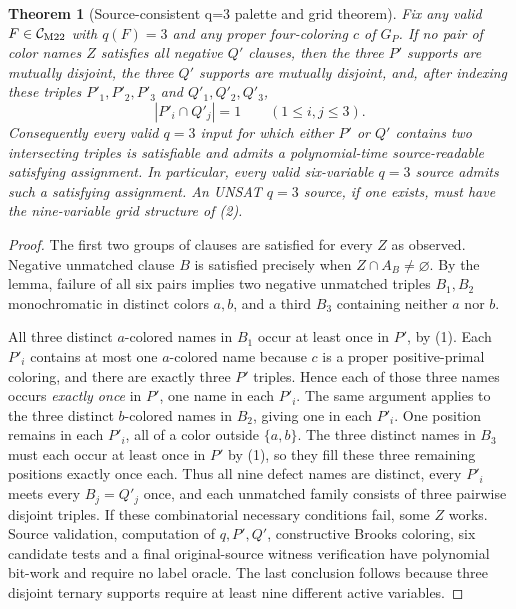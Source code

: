 \documentclass[11pt]{article}
\newtheorem{theorem}{Theorem}
\newcommand{\CM}{\mathcal C_{\rm M22}}
\begin{document}
\begin{theorem}[Source-consistent q=3 palette and grid theorem]
Fix \emph{any} valid $F\in\CM$ with $q(F)=3$ and any proper
four-coloring $c$ of $G_P$.
If no pair of color names $Z$ satisfies all negative $Q'$ clauses,
then the three $P'$ supports are mutually disjoint, the three $Q'$
supports are mutually disjoint, and, after indexing these triples
$P'_1,P'_2,P'_3$ and $Q'_1,Q'_2,Q'_3$,
\[
     |P'_i\cap Q'_j|=1\qquad(1\le i,j\le3).       \tag{2}
\]
Consequently every valid $q=3$ input for which either $P'$ or
$Q'$ contains two intersecting triples is satisfiable and admits
a polynomial-time source-readable satisfying assignment.
In particular, every valid six-variable $q=3$ source admits
such a satisfying assignment. An UNSAT $q=3$ source, if one exists,
must have the nine-variable grid structure of (2).
\end{theorem}
\begin{proof}
The first two groups of clauses are satisfied for every $Z$ as
observed. Negative unmatched clause $B$ is satisfied precisely
when $Z\cap A_B\ne\varnothing$. By the lemma, failure of all six
pairs implies two negative unmatched triples $B_1,B_2$ monochromatic
in distinct colors $a,b$, and a third $B_3$ containing neither
$a$ nor $b$.

All three distinct $a$-colored names in $B_1$ occur at least once
in $P'$, by (1). Each $P'_i$ contains at most one $a$-colored name
because $c$ is a proper positive-primal coloring, and there are
exactly three $P'$ triples. Hence each of those three names
occurs \emph{exactly once} in $P'$, one name in each $P'_i$.
The same argument applies to the three distinct $b$-colored names
in $B_2$, giving one in each $P'_i$.
One position remains in each $P'_i$, all of a color outside
$\{a,b\}$. The three distinct names in $B_3$ must each occur
at least once in $P'$ by (1), so they fill these three remaining
positions exactly once each. Thus all nine defect names are
distinct, every $P'_i$ meets every $B_j=Q'_j$ once, and each
unmatched family consists of three pairwise disjoint triples.
If these combinatorial necessary conditions fail, some $Z$ works.
Source validation, computation of $q,P',Q'$, constructive Brooks
coloring, six candidate tests and a final original-source witness
verification have polynomial bit-work and require no label oracle.
The last conclusion follows because three disjoint ternary
supports require at least nine different active variables.
\end{proof}
\end{document}
